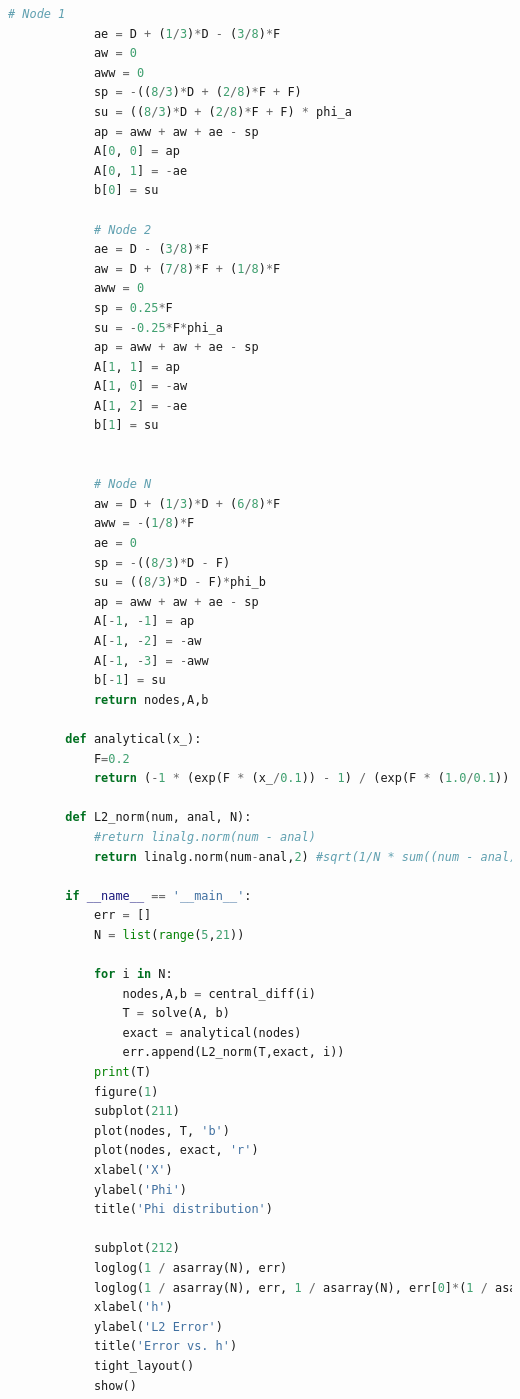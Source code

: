\documentclass[paper=a4, fontsize=11pt]{article} %
\numberwithin{equation}{section} %
\numberwithin{figure}{section} %
\numberwithin{table}{section} %
\begin{document}
\begin{center}
\begin{lstlisting}[language=Python, captionpos = b, caption=Source code for excercise 1]
            # Node 1
            ae = D + (1/3)*D - (3/8)*F
            aw = 0
            aww = 0
            sp = -((8/3)*D + (2/8)*F + F)
            su = ((8/3)*D + (2/8)*F + F) * phi_a
            ap = aww + aw + ae - sp
            A[0, 0] = ap
            A[0, 1] = -ae
            b[0] = su

            # Node 2
            ae = D - (3/8)*F
            aw = D + (7/8)*F + (1/8)*F
            aww = 0
            sp = 0.25*F
            su = -0.25*F*phi_a
            ap = aww + aw + ae - sp
            A[1, 1] = ap
            A[1, 0] = -aw
            A[1, 2] = -ae
            b[1] = su
            

            # Node N
            aw = D + (1/3)*D + (6/8)*F
            aww = -(1/8)*F
            ae = 0
            sp = -((8/3)*D - F)
            su = ((8/3)*D - F)*phi_b
            ap = aww + aw + ae - sp
            A[-1, -1] = ap
            A[-1, -2] = -aw
            A[-1, -3] = -aww
            b[-1] = su
            return nodes,A,b

        def analytical(x_):
            F=0.2
            return (-1 * (exp(F * (x_/0.1)) - 1) / (exp(F * (1.0/0.1)) - 1)) + 1

        def L2_norm(num, anal, N):
            #return linalg.norm(num - anal)
            return linalg.norm(num-anal,2) #sqrt(1/N * sum((num - anal)**2))

        if __name__ == '__main__':
            err = []
            N = list(range(5,21))

            for i in N:
                nodes,A,b = central_diff(i)
                T = solve(A, b)
                exact = analytical(nodes)
                err.append(L2_norm(T,exact, i))
            print(T)
            figure(1)
            subplot(211)
            plot(nodes, T, 'b')
            plot(nodes, exact, 'r')
            xlabel('X')
            ylabel('Phi')
            title('Phi distribution')

            subplot(212)
            loglog(1 / asarray(N), err)
            loglog(1 / asarray(N), err, 1 / asarray(N), err[0]*(1 / asarray(N) * N[0]))
            xlabel('h')
            ylabel('L2 Error')
            title('Error vs. h')
            tight_layout()
            show()
        \end{lstlisting}
    
    \end{center}

    
\end{document}
